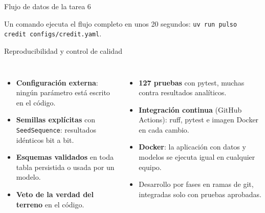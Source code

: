 \documentclass[aspectratio=169,10pt]{beamer}
\begin{document}
\begin{frame}{Flujo de datos de la tarea 6}
\centering
{}

\vspace{0.4cm}
\small Un comando ejecuta el flujo completo en unos 20 segundos:
\texttt{uv run pulso credit configs/credit.yaml}.
\end{frame}

\begin{frame}{Reproducibilidad y control de calidad}
\begin{columns}[T]
\begin{itemize}
\item \textbf{Configuración externa}: ningún parámetro está escrito en el código.
\item \textbf{Semillas explícitas} con \texttt{SeedSequence}: resultados idénticos bit a
bit.
\item \textbf{Esquemas validados} en toda tabla persistida o usada por un modelo.
\item \textbf{Veto de la verdad del terreno} en el código.
\end{itemize}
\begin{itemize}
\item \textbf{127 pruebas} con pytest, muchas contra resultados analíticos.
\item \textbf{Integración continua} (GitHub Actions): ruff, pytest e imagen Docker en
cada cambio.
\item \textbf{Docker}: la aplicación con datos y modelos se ejecuta igual en cualquier
equipo.
\item Desarrollo por fases en ramas de git, integradas solo con pruebas aprobadas.
\end{itemize}
\end{columns}
\end{frame}
\end{document}
